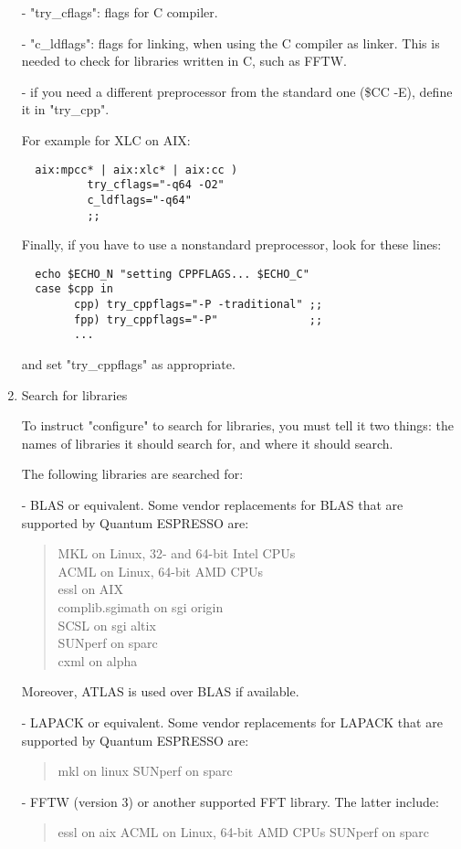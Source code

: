 \documentclass[12pt,a4paper]{article}
\begin{document}
\begin{enumerate}
- "try\_cflags": flags for C compiler.

- "c\_ldflags": flags for linking, when using the C compiler as linker.
This is needed to check for libraries written in C, such as FFTW.

- if you need a different preprocessor from the standard one (\$CC -E),
define it in "try\_cpp".

For example for XLC on AIX:
\begin{verbatim}
  aix:mpcc* | aix:xlc* | aix:cc )
          try_cflags="-q64 -O2"
          c_ldflags="-q64"
          ;;
\end{verbatim}
Finally, if you have to use a nonstandard preprocessor, look for these
lines:
\begin{verbatim}
  echo $ECHO_N "setting CPPFLAGS... $ECHO_C"
  case $cpp in
        cpp) try_cppflags="-P -traditional" ;;
        fpp) try_cppflags="-P"              ;;
        ...
\end{verbatim}
and set "try\_cppflags" as appropriate.

\item Search for libraries

To instruct "configure" to search for libraries, you must tell it two
things: the names of libraries it should search for, and where it
should search.

The following libraries are searched for:

- BLAS or equivalent. 
Some vendor replacements for BLAS that are supported by Quantum ESPRESSO are:
\begin{quote}
    MKL on Linux, 32- and 64-bit Intel CPUs\\
    ACML on Linux, 64-bit AMD CPUs\\
    essl on AIX\\
    complib.sgimath on sgi origin\\
    SCSL on sgi altix\\
    SUNperf on sparc\\
    cxml on alpha
\end{quote}
Moreover, ATLAS is used over BLAS if available.

- LAPACK or equivalent. Some vendor replacements for LAPACK that are supported by Quantum ESPRESSO are:
\begin{quote}
    mkl on linux
    SUNperf on sparc
\end{quote}

- FFTW (version 3) or another supported FFT library. The latter include:
\begin{quote}
    essl on aix
    ACML on Linux, 64-bit AMD CPUs
    SUNperf on sparc
\end{quote}


\end{enumerate}
\end{document}
